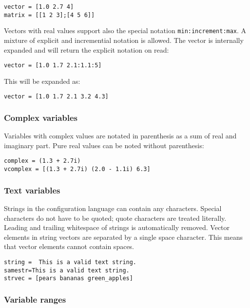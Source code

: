 \begin{verbatim}
vector = [1.0 2.7 4]
matrix = [[1 2 3];[4 5 6]]
\end{verbatim}

Vectors with real values support also the special notation
\verb!min:increment:max!. A mixture of explicit and incremential
notation is allowed. The vector is internally expanded and will return
the explicit notation on read:

\begin{verbatim}
vector = [1.0 1.7 2.1:1.1:5]
\end{verbatim}

This will be expanded as:

\begin{verbatim}
vector = [1.0 1.7 2.1 3.2 4.3]
\end{verbatim}

\subsubsection{Complex variables}%
%
%

Variables with complex values are notated in parenthesis as a sum of
real and imaginary part. Pure real values can be noted without
parenthesis:

\begin{verbatim}
complex = (1.3 + 2.7i)
vcomplex = [(1.3 + 2.7i) (2.0 - 1.1i) 6.3]
\end{verbatim}

\subsubsection{Text variables}

Strings in the \mha{} configuration language can contain any characters. Special
characters do not have to be quoted; quote characters are treated
literally. Leading and trailing whitespace of strings is automatically
removed. Vector elements in string vectors are separated by a single
space character. This means that vector elements cannot contain spaces.

\begin{verbatim}
string =  This is a valid text string.
samestr=This is a valid text string.
strvec = [pears bananas green_apples]
\end{verbatim}

\subsubsection{Variable ranges}

